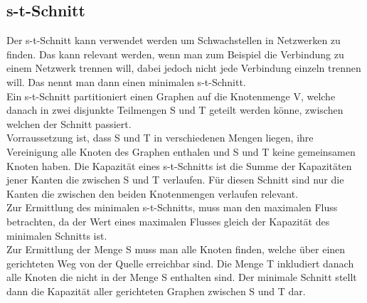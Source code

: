 \documentclass{article}
\begin{document}
	\subsection{s-t-Schnitt}
	Der s-t-Schnitt kann verwendet werden um Schwachstellen in Netzwerken zu finden. Das kann relevant werden, wenn man zum Beispiel die Verbindung zu einem Netzwerk trennen will, dabei jedoch nicht jede Verbindung einzeln trennen will. Das nennt man dann einen minimalen s-t-Schnitt. \\
	Ein s-t-Schnitt partitioniert einen Graphen auf die Knotenmenge V, welche danach in zwei disjunkte Teilmengen S und T geteilt werden könne, zwischen welchen der Schnitt passiert. \\
	Vorraussetzung ist, dass S und T in verschiedenen Mengen liegen, ihre Vereinigung alle Knoten des Graphen enthalen und S und T keine gemeinsamen Knoten haben. Die Kapazität eines s-t-Schnitts ist die Summe der Kapazitäten jener Kanten die zwischen S und T verlaufen. Für diesen Schnitt sind nur die Kanten die zwischen den beiden Knotenmengen verlaufen relevant. \\
	Zur Ermittlung des minimalen s-t-Schnitts, muss man den maximalen Fluss betrachten, da der Wert eines maximalen Flusses gleich der Kapazität des minimalen Schnitts ist. \\
	Zur Ermittlung der Menge S muss man alle Knoten finden, welche über einen gerichteten Weg von der Quelle erreichbar sind. Die Menge T inkludiert danach alle Knoten die nicht in der Menge S enthalten sind. Der minimale Schnitt stellt dann die Kapazität aller gerichteten Graphen zwischen S und T dar.

	























  
\end{document}
